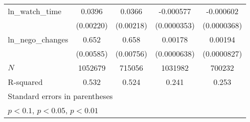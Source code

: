 {\begin{tabular}{l*{4}{c}}
\addlinespace
ln\_watch\_time&      0.0396\sym{***}&      0.0366\sym{***}&   -0.000577\sym{***}&   -0.000602\sym{***}\\
            &   (0.00220)         &   (0.00218)         & (0.0000353)         & (0.0000368)         \\
\addlinespace
ln\_nego\_changes&       0.652\sym{***}&       0.658\sym{***}&     0.00178\sym{***}&     0.00194\sym{***}\\
            &   (0.00585)         &   (0.00756)         & (0.0000638)         & (0.0000827)         \\
\midrule
\(N\)       &     1052679         &      715056         &     1031982         &      700232         \\
R-squared   &       0.532         &       0.524         &       0.241         &       0.253         \\
\bottomrule
\multicolumn{5}{l}{\footnotesize Standard errors in parentheses}\\
\multicolumn{5}{l}{\footnotesize \sym{*} \(p<0.1\), \sym{**} \(p<0.05\), \sym{***} \(p<0.01\)}\\
\end{tabular}
}
